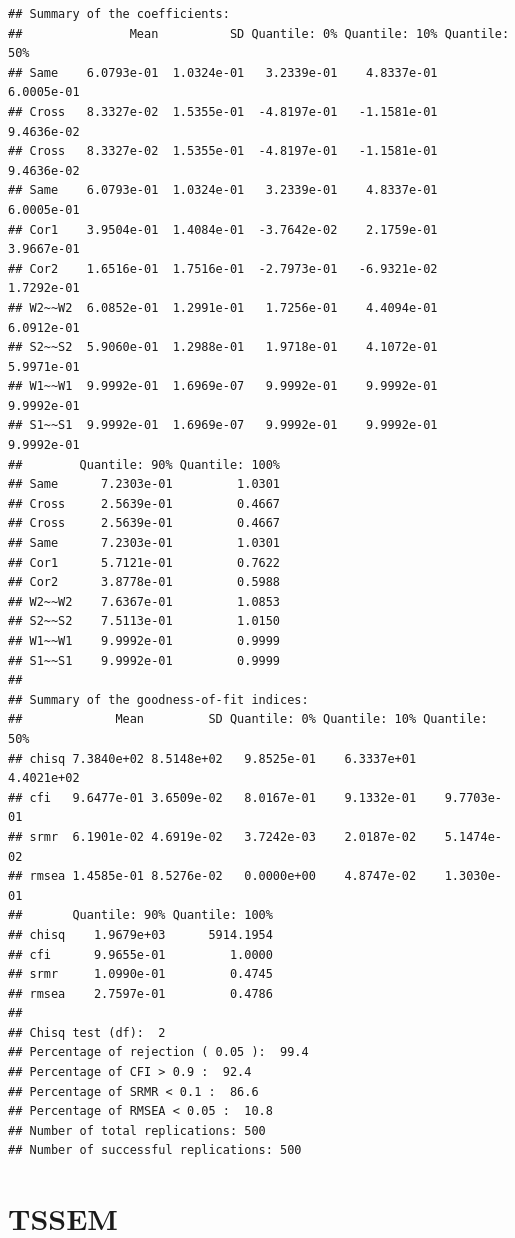 \documentclass[]{article}
\newenvironment{Shaded}{\begin{snugshade}}{\end{snugshade}}
\newcommand{\KeywordTok}[1]{\textcolor[rgb]{0.13,0.29,0.53}{\textbf{#1}}}
\newcommand{\DataTypeTok}[1]{\textcolor[rgb]{0.13,0.29,0.53}{#1}}
\newcommand{\StringTok}[1]{\textcolor[rgb]{0.31,0.60,0.02}{#1}}
\newcommand{\OperatorTok}[1]{\textcolor[rgb]{0.81,0.36,0.00}{\textbf{#1}}}
\newcommand{\NormalTok}[1]{#1}
\begin{document}
\begin{verbatim}
## Summary of the coefficients:
##               Mean          SD Quantile: 0% Quantile: 10% Quantile: 50%
## Same    6.0793e-01  1.0324e-01   3.2339e-01    4.8337e-01    6.0005e-01
## Cross   8.3327e-02  1.5355e-01  -4.8197e-01   -1.1581e-01    9.4636e-02
## Cross   8.3327e-02  1.5355e-01  -4.8197e-01   -1.1581e-01    9.4636e-02
## Same    6.0793e-01  1.0324e-01   3.2339e-01    4.8337e-01    6.0005e-01
## Cor1    3.9504e-01  1.4084e-01  -3.7642e-02    2.1759e-01    3.9667e-01
## Cor2    1.6516e-01  1.7516e-01  -2.7973e-01   -6.9321e-02    1.7292e-01
## W2~~W2  6.0852e-01  1.2991e-01   1.7256e-01    4.4094e-01    6.0912e-01
## S2~~S2  5.9060e-01  1.2988e-01   1.9718e-01    4.1072e-01    5.9971e-01
## W1~~W1  9.9992e-01  1.6969e-07   9.9992e-01    9.9992e-01    9.9992e-01
## S1~~S1  9.9992e-01  1.6969e-07   9.9992e-01    9.9992e-01    9.9992e-01
##        Quantile: 90% Quantile: 100%
## Same      7.2303e-01         1.0301
## Cross     2.5639e-01         0.4667
## Cross     2.5639e-01         0.4667
## Same      7.2303e-01         1.0301
## Cor1      5.7121e-01         0.7622
## Cor2      3.8778e-01         0.5988
## W2~~W2    7.6367e-01         1.0853
## S2~~S2    7.5113e-01         1.0150
## W1~~W1    9.9992e-01         0.9999
## S1~~S1    9.9992e-01         0.9999
## 
## Summary of the goodness-of-fit indices:
##             Mean         SD Quantile: 0% Quantile: 10% Quantile: 50%
## chisq 7.3840e+02 8.5148e+02   9.8525e-01    6.3337e+01    4.4021e+02
## cfi   9.6477e-01 3.6509e-02   8.0167e-01    9.1332e-01    9.7703e-01
## srmr  6.1901e-02 4.6919e-02   3.7242e-03    2.0187e-02    5.1474e-02
## rmsea 1.4585e-01 8.5276e-02   0.0000e+00    4.8747e-02    1.3030e-01
##       Quantile: 90% Quantile: 100%
## chisq    1.9679e+03      5914.1954
## cfi      9.9655e-01         1.0000
## srmr     1.0990e-01         0.4745
## rmsea    2.7597e-01         0.4786
## 
## Chisq test (df):  2
## Percentage of rejection ( 0.05 ):  99.4
## Percentage of CFI > 0.9 :  92.4
## Percentage of SRMR < 0.1 :  86.6
## Percentage of RMSEA < 0.05 :  10.8
## Number of total replications: 500
## Number of successful replications: 500
\end{verbatim}

\section{TSSEM}\label{tssem}

\begin{Shaded}
\end{Shaded}
\end{document}
